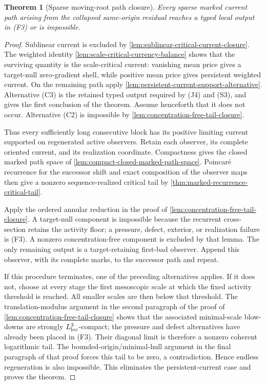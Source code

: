 \documentclass[11pt]{amsart}
\numberwithin{equation}{section}
\theoremstyle{plain}
\newtheorem{theorem}{Theorem}[section]
\theoremstyle{definition}
\theoremstyle{remark}
\begin{document}
\begin{theorem}[Sparse moving-root path closure]
\label{thm:sparse-moving-root-path-exclusion}
Every sparse marked current path arising from the collapsed same-origin
residual reaches a typed local output in \textup{(F3)} or is impossible.
\end{theorem}

\begin{proof}
Sublinear current is excluded by
\cref{lem:sublinear-critical-current-closure}.  The weighted identity
\cref{lem:scale-critical-currency-balance} shows that the surviving quantity is
the scale-critical current: vanishing mean price gives a target-null
zero-gradient shell, while positive mean price gives persistent weighted
current.  On the remaining path apply
\cref{lem:persistent-current-support-alternative}.  Alternative
\textup{(C3)} is the retained typed output required by
\textup{(J4)} and \textup{(S3)}, and gives the first conclusion of the
theorem.  Assume henceforth that it does not occur.  Alternative
\textup{(C2)} is impossible by
\cref{lem:concentration-free-tail-closure}.

Thus every sufficiently long consecutive block has its positive limiting
current supported on regenerated active observers.  Retain each observer,
its complete oriented current, and its realization coordinate.  Compactness
gives the closed marked path space of
\cref{lem:compact-closed-marked-path-space}.  Poincar\'e recurrence for the
successor shift and exact composition of the observer maps then give a
nonzero sequence-realized critical tail by
\cref{thm:marked-recurrence-critical-tail}.

Apply the ordered annular reduction in the proof of
\cref{lem:concentration-free-tail-closure}.  A target-null component is
impossible because the recurrent cross-section retains the activity floor; a
pressure, defect, exterior, or realization failure is \textup{(F3)}.  A
nonzero concentration-free component is excluded by that lemma.  The only
remaining output is a target-retaining first-bad observer.  Append this
observer, with its complete marks, to the successor path and repeat.

If this procedure terminates, one of the preceding alternatives applies.  If
it does not, choose at every stage the first mesoscopic scale at which the
fixed activity threshold is reached.  All smaller scales are then below that
threshold.  The translation-modulus argument in the second paragraph of the
proof of \cref{lem:concentration-free-tail-closure} shows that the associated
minimal-scale blow-downs are strongly \(L^3_{\rm loc}\)-compact; the pressure
and defect alternatives have already been placed in \textup{(F3)}.  Their
diagonal limit is therefore a nonzero coherent logarithmic tail.  The
bounded-origin/minimal-hull argument in the final paragraph of that proof
forces this tail to be zero, a contradiction.  Hence endless regeneration is
also impossible.  This eliminates the persistent-current case and proves the
theorem.
\end{proof}
\end{document}
